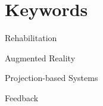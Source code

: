 \section*{Keywords}

{\large %

\noindent Rehabilitation

\noindent Augmented Reality

\noindent Projection-based Systems

\noindent Feedback

}

\vfill


\cleardoublepage

\pagestyle{plain}

 
\def\contentsname{Contents}
\tableofcontents
\newpage

\listoffigures
\newpage

\listoftables

\cleardoublepage

